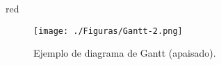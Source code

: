 \begin{consigna}{red}
	\begin{landscape}
		\begin{figure}[htpb]
			\centering
			\texttt{[image: ./Figuras/Gantt-2.png]}
			\caption{Ejemplo de diagrama de Gantt (apaisado).} %
			\label{fig:diagGantt}
		\end{figure}

	\end{landscape}

\end{consigna}